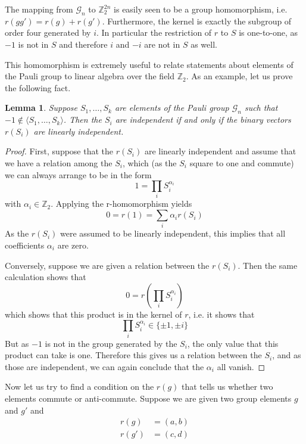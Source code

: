 \documentclass[a4paper, draft]{article}
\theoremstyle{own}
\newtheorem{lem}[thm]{Lemma}
\theoremstyle{remark}
\newcommand{\Z}{\mathbb{Z}}
\begin{document}
The mapping from $\mathcal{G}_n$ to $\Z_2^{2n}$ is easily seen to be a group homomorphism, i.e. $r(g g') = r(g) + r(g')$. Furthermore, the kernel is exactly the subgroup of order four generated by $i$. In particular the restriction of $r$ to $S$ is one-to-one, as $-1$ is not in $S$ and therefore $i$ and $-i$ are not in $S$ as well.

This homomorphism is extremely useful to relate statements about elements of the Pauli group to linear algebra over the field $\Z_2$. As an example, let us prove the following fact.

\begin{lem}
Suppose $S_1, \dots, S_k$ are elements of the Pauli group $\mathcal{G}_n$ such that $-1 \notin \langle S_1, \dots, S_k \rangle$. Then the $S_i$ are independent if and only if the binary vectors $r(S_i)$ are linearly independent.
\end{lem}

\begin{proof}
First, suppose that the $r(S_i)$ are linearly independent and assume that we have a relation among the $S_i$, which (as the $S_i$ square to one and commute) we can always arrange to be in the form
$$
1 = \prod_i S_i^{\alpha_i}
$$
with $\alpha_i \in \Z_2$. Applying the r-homomorphism yields
$$
0 = r(1) = \sum_i \alpha_i r(S_i)
$$
As the $r(S_i)$ were assumed to be linearly independent, this implies that all coefficients $\alpha_i$ are zero.

Conversely, suppose we are given a relation between the $r(S_i)$. Then the same calculation shows that
$$
0 = r(\prod_i S_i^{\alpha_i})
$$
which shows that this product is in the kernel of $r$, i.e. it shows that
$$
\prod_i S_i^{\alpha_i} \in \{  \pm 1, \pm i \}
$$
But as $-1$ is not in the group generated by the $S_i$, the only value that this product can take is one. Therefore this gives us a relation between the $S_i$, and as those are independent, we can again conclude that the $\alpha_i$ all vanish.
\end{proof}


Now let us try to find a condition on the $r(g)$ that tells us whether two elements commute or anti-commute. Suppose we are given two group elements $g$ and $g'$ and
\begin{align*}
r(g) &= (a , b) \\
r(g') &= (c, d)
\end{align*}
\end{document}

